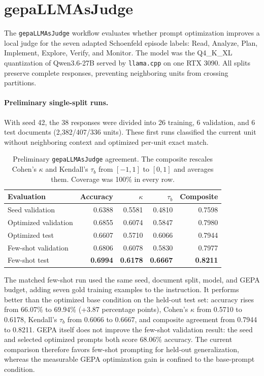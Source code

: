 \section{gepaLLMAsJudge}

The \texttt{gepaLLMAsJudge} workflow evaluates whether prompt optimization
improves a local judge for
the seven adapted Schoenfeld episode labels: Read, Analyze, Plan, Implement,
Explore, Verify, and Monitor.  The model was the Q4\_K\_XL quantization of
Qwen3.6-27B served by \texttt{llama.cpp} on one RTX 3090.  All splits preserve
complete responses, preventing neighboring units from crossing partitions.

\paragraph{Preliminary single-split runs.}
With seed 42, the 38 responses were divided into 26 training, 6 validation,
and 6 test documents (2,382/407/336 units).  These first runs classified the
current unit without neighboring context and optimized per-unit exact match.

\begin{table}[t]
\centering
\caption{Preliminary \texttt{gepaLLMAsJudge} agreement.  The composite rescales Cohen's
$\kappa$ and Kendall's $\tau_b$ from $[-1,1]$ to $[0,1]$ and averages them.
Coverage was 100\% in every row.  }
\label{tab:exp0a-judge}
\begin{tabular}{lrrrr}
\toprule
Evaluation & Accuracy & $\kappa$ & $\tau_b$ & Composite \\
\midrule
Seed validation      & 0.6388 & 0.5581 & 0.4810 & 0.7598 \\
Optimized validation & 0.6855 & 0.6074 & 0.5847 & 0.7980 \\
Optimized test       & 0.6607 & 0.5710 & 0.6066 & 0.7944 \\
Few-shot validation  & 0.6806 & 0.6078 & 0.5830 & 0.7977 \\
Few-shot test        & \textbf{0.6994} & \textbf{0.6178} &
\textbf{0.6667} & \textbf{0.8211} \\
\bottomrule
\end{tabular}
\end{table}

The matched few-shot run used the same seed, document split, model, and GEPA
budget, adding seven gold training examples to the instruction.  It performs
better than the optimized base condition on the held-out test set: accuracy
rises from 66.07\% to 69.94\% (+3.87 percentage points), Cohen's $\kappa$ from
0.5710 to 0.6178, Kendall's $\tau_b$ from 0.6066 to 0.6667, and composite
agreement from 0.7944 to 0.8211.  GEPA itself does not improve the few-shot
validation result: the seed and selected optimized prompts both score 68.06\%
accuracy.  The current comparison therefore favors few-shot prompting for
held-out generalization, whereas the measurable GEPA optimization gain is
confined to the base-prompt condition.

